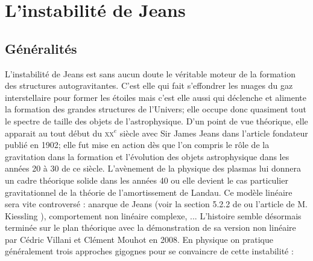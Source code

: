 \section{L'instabilit\'{e} de Jeans}\label{Chap::Instabilite::Sec::Jeans}

\subsection{Généralités}
L'instabilité de Jeans est sans aucun doute le véritable moteur de la formation des structures autogravitantes.
C'est elle qui fait s'effondrer les nuages du gaz interstellaire pour former les étoiles mais c'est elle aussi qui déclenche et alimente la formation des grandes structures de l'Univers; elle occupe donc quasiment tout le spectre de taille des objets de l'astrophysique. 
D'un point de vue théorique, elle apparait au tout début du \textsc{xx}$^e$ siècle avec Sir James Jeans dans l'article fondateur \cite{jeans02} publié en 1902; elle fut mise en action dès que l'on compris le rôle de la gravitation dans la formation et l'évolution  des objets astrophysique dans les années 20 à 30 de ce siècle. L'avènement de la physique des plasmas lui donnera un cadre théorique solide dans les années 40 ou elle devient le cas particulier gravitationnel de la théorie de l'amortissement de Landau. Ce modèle linéaire 
sera vite controversé  : anarque de Jeans (voir la section 5.2.2 de \cite{2008gady.book.....B}  ou l'article de M. Kiessling \cite{kiessling}), comportement non linéaire complexe, ... L'histoire semble désormais terminée sur le plan théorique avec la démonstration de sa version non linéaire par Cédric Villani et Clément Mouhot en 2008. En physique on pratique généralement trois approches gigognes pour se convaincre de cette instabilité : 
